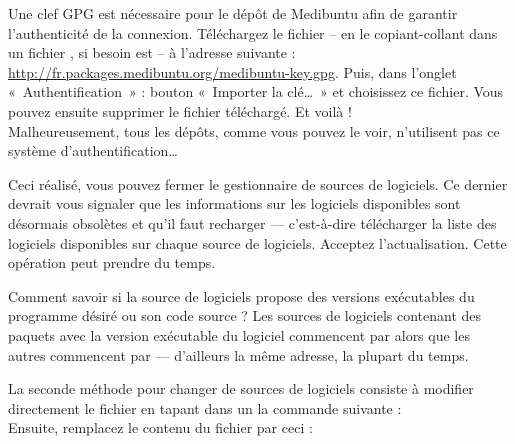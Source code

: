 {Une clef GPG est nécessaire pour le dépôt de Medibuntu afin de garantir l'authenticité de la connexion. Téléchargez le fichier  -- en le copiant-collant dans un fichier , si besoin est -- à l'adresse suivante : \url{http://fr.packages.medibuntu.org/medibuntu-key.gpg}. Puis, dans l'onglet «~Authentification~» : bouton «~Importer la clé\ldots{}~» et choisissez ce fichier. Vous pouvez ensuite supprimer le fichier téléchargé. Et voilà !\\
Malheureusement, tous les dépôts, comme vous pouvez le voir, n'utilisent pas ce système d'authentification\ldots{}\par
Ceci réalisé, vous pouvez fermer le gestionnaire de sources de logiciels. Ce dernier devrait vous signaler que les informations sur les logiciels disponibles sont désormais obsolètes et qu'il faut recharger --- c'est-à-dire télécharger la liste des logiciels disponibles sur chaque source de logiciels. Acceptez l'actualisation. Cette opération peut prendre du temps.\par
\begin{nota}
Comment savoir si la source de logiciels propose des versions exécutables du programme désiré ou son code source ? Les sources de logiciels contenant des paquets avec la version exécutable du logiciel commencent par  alors que les autres commencent par  --- d'ailleurs la même adresse, la plupart du temps.
\end{nota}
La seconde méthode pour changer de sources de logiciels consiste à modifier directement le fichier  en tapant dans un  la commande suivante : \\
Ensuite, remplacez le contenu du fichier par ceci :\\
}
